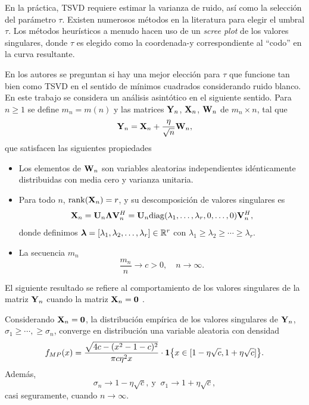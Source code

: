 	En la práctica, TSVD requiere estimar la varianza de ruido, así como la selección del parámetro $\tau$. Existen numerosos métodos en la literatura para elegir el umbral $\tau$. Los métodos heurísticos a menudo hacen uso de un \emph{scree plot} de los valores singulares, donde $\tau$ es elegido como la coordenada-y correspondiente al ``codo'' en la curva resultante.
		
	En \cite{Gavish2014} los autores se preguntan si hay una mejor elección para $\tau$ que funcione tan bien como TSVD en el sentido de mínimos cuadrados considerando ruido blanco. En este trabajo se considera un análisis asintótico en el siguiente sentido. Para $n\ge1$ se define $m_n = m(n)$ y las  matrices $\mathbf{Y}_n$, $\mathbf{X}_n$, $\mathbf{W}_n$ de $m_n\times n$, tal que  
	\begin{equation}
		\mathbf{Y}_n = \mathbf{X}_n +\frac{\eta}{\sqrt{n}}\mathbf{W}_n,
		\label{eq:AsymptoticModel}
	\end{equation}
	que satisfacen las siguientes propiedades
	\begin{itemize}
		\item Los elementos de $\mathbf{W}_n$ son variables aleatorias independientes idénticamente distribuidas con media cero y varianza unitaria.
		\item Para todo $n$, $\mathrm{rank}(\mathbf{X}_n) = r$, y su descomposición de valores singulares es 
		\[\mathbf{X}_n = \mathbf{U}_n\boldsymbol{\Lambda}\mathbf{V}_n^H = \mathbf{U}_n\mathrm{diag}(\lambda_1,\ldots,\lambda_r,0,\ldots,0)\mathbf{V}_n^H,\]
		donde definimos $\boldsymbol{\lambda} = [\lambda_1, \lambda_2,\ldots,\lambda_r]\in\mathbb{R}^{r}$ con $\lambda_1\ge\lambda_2\ge\cdots\ge\lambda_r.$
		\item La secuencia $m_n$ 
		\[
			\frac{m_n}{n}\to c > 0,\quad n\to\infty.
		\]
	\end{itemize}
		
	El siguiente resultado se refiere al comportamiento de los valores singulares de la matriz $\mathbf{Y}_n$ cuando la matriz $\mathbf{X}_n = \mathbf{0}$ \cite{Bai2010}.
		
	\begin{prop}\label{Prop:MP}
		Considerando $\mathbf{X}_n =\mathbf{0}$, la distribución empírica de los valores singulares de $\mathbf{Y}_n$, $\sigma_1\ge\cdots,\ge\sigma_n$, converge en distribución una variable aleatoria con densidad
		\begin{equation}
			f_{MP}(x) = \frac{\sqrt{4c-(x^2-1-c)^2}}{\pi c\eta^2 x}\cdot\mathbf{1}\big\{x\in[1-\eta\sqrt{c},1+\eta\sqrt{c}]\big\}.
			\label{Eq:MPDensity}
		\end{equation}
		Además,
		\begin{equation}
			\sigma_n \to 1-\eta\sqrt{c}, \ \text{y } \ 
			\sigma_1 \to 1+\eta\sqrt{c}, 
		\end{equation}
		casi seguramente, cuando $n\to \infty$.
	\end{prop} 

